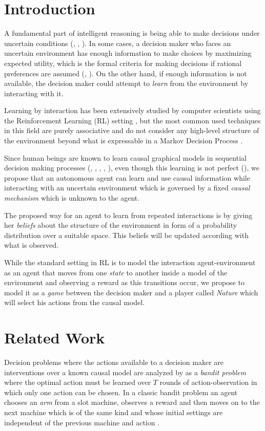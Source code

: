 \documentclass{article}
\begin{document}
\section{Introduction}
A fundamental part of intelligent reasoning is being able to make decisions under uncertain conditions (\cite{lake2017building}, \cite{danks2014unifying}, \cite{pearlwhy}). In some cases, a decision maker who faces an uncertain environment has enough information to make choices by maximizing expected utility, which is the formal criteria for making decisions if rational preferences are assumed (\cite{bernardo2000bayesian}, \cite{gilboa2009decision}). On the other hand, if enough information is not available, the decision maker could attempt to \textit{learn} from the environment by interacting with it.

Learning by interaction has been extensively studied by computer scientists using the Reinforcement Learning (RL) setting \cite{sutton1998reinforcement}, but the most common used techniques  in this field are purely associative and do not consider any high-level structure of the environment beyond what is expressable in a Markov Decision Process \cite{garnelo2016towards}.

Since human beings are known to learn causal graphical models in sequential decision making processes (\cite{sloman2006causal}, \cite{nichols2007decision}, \cite{meder2010observing}, \cite{hagmayer2013repeated}, \cite{danks2014unifying}), even though this learning is not perfect (\cite{rottman2014reasoning}), we propose that an autonomous agent can learn and use causal information while interacting with an uncertain environment which is governed by a fixed \textit{causal mechanism} which is unknown to the agent.  

The proposed way for an agent to learn from repeated interactions is by giving her \textit{beliefs} about the structure of the environment in form of a probability distribution over a suitable space. This beliefs will be updated according with what is observed.

While the standard setting in RL is to model the interaction agent-environment as an agent that moves from one \textit{state} to another inside a model of the environment and observing a reward as this transitions occur, we propose to model it as a \textit{game} between the decision maker and a player called \textit{Nature} which will select his actions from the causal model.

\section{Related Work}
Decision problems where the actions available to a decision maker are interventions over a known causal model are analyzed by \cite{lattimoreNIPS2016} as a \textit{bandit problem} where the optimal action must be learned over $T$ rounds of action-observation in which only one action can be chosen. In a classic bandit problem an agent chooses an \textit{arm} from a slot machine, observes a reward and then moves on to the next machine which is of the same kind and whose initial settings are independent of the previous machine and action \cite{sutton1998reinforcement}.
\end{document}
